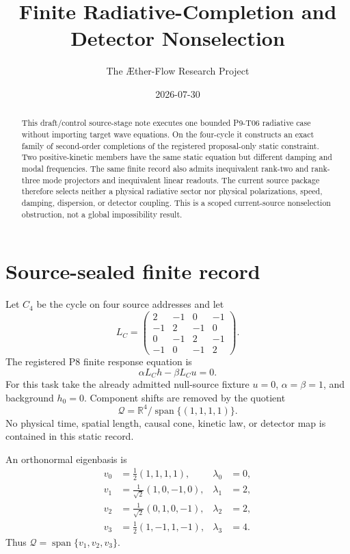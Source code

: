 \documentclass[11pt]{article}
\title{Finite Radiative-Completion and Detector Nonselection}
\author{The \AE ther-Flow Research Project}
\date{2026-07-30}
\newcommand{\Qspace}{\mathcal Q}
\newcommand{\LC}{L_C}
\begin{document}
\maketitle

\begin{abstract}
This draft/control source-stage note executes one bounded P9-T06 radiative
case without importing target wave equations.  On the four-cycle it constructs
an exact family of second-order completions of the registered proposal-only
static constraint.  Two positive-kinetic members have the same static equation
but different damping and modal frequencies.  The same finite record also
admits inequivalent rank-two and rank-three mode projectors and inequivalent
linear readouts.  The current source package therefore selects neither a
physical radiative sector nor physical polarizations, speed, damping,
dispersion, or detector coupling.  This is a scoped current-source
nonselection obstruction, not a global impossibility result.
\end{abstract}

\section{Source-sealed finite record}

Let \(C_4\) be the cycle on four source addresses and let
\[
\LC=
\begin{pmatrix}
2&-1&0&-1\\
-1&2&-1&0\\
0&-1&2&-1\\
-1&0&-1&2
\end{pmatrix}.
\]
The registered P8 finite response equation is
\[
 \alpha\LC h-\beta\LC u=0.
\]
For this task take the already admitted null-source fixture \(u=0\),
\(\alpha=\beta=1\), and background \(h_0=0\).  Component shifts are removed
by the quotient
\[
 \Qspace=\mathbb R^4/\operatorname{span}\{(1,1,1,1)\}.
\]
No physical time, spatial length, causal cone, kinetic law, or detector map is
contained in this static record.

An orthonormal eigenbasis is
\[
\begin{aligned}
 v_0&=\tfrac12(1,1,1,1), &\lambda_0&=0,\\
 v_1&=\tfrac1{\sqrt2}(1,0,-1,0), &\lambda_1&=2,\\
 v_2&=\tfrac1{\sqrt2}(0,1,0,-1), &\lambda_2&=2,\\
 v_3&=\tfrac12(1,-1,1,-1), &\lambda_3&=4 .
\end{aligned}
\]
Thus \(\Qspace=\operatorname{span}\{v_1,v_2,v_3\}\).
\end{document}
